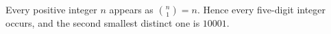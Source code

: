 Every positive integer $n$ appears as $\binom n1=n$. Hence every five-digit integer occurs, and the second smallest distinct one is $\boxed{10001}$.
